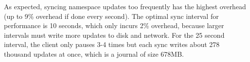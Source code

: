 As expected, syncing namespace updates too frequently has the highest overhead
(up to 9\% overhead if done every second). The optimal sync interval for
performance is 10 seconds, which only incurs 2\% overhead, because larger
intervals must write more updates to disk and network. For the 25 second
interval, the client only pauses 3-4 times but each sync writes about 278
thousand updates at once, which is a journal of size 678MB.


%
%

%

%

